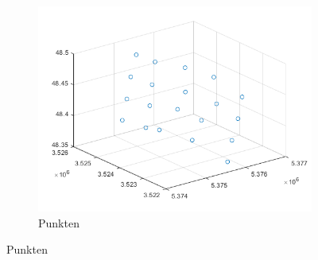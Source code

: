 \begin{figure}[ht]\centering
	\begin{subfigure}{.8\textwidth}
		\centering
		\includegraphics[width=.8\linewidth]{Images/Hoeheanomaliepunkt}  
		\caption{Punkten}
		\label{fig:sub-first}
	\end{subfigure}
\end{figure}

\newpage
